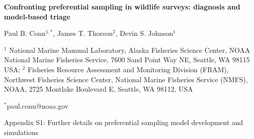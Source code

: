 \documentclass[times,mee,doublespace,]{besauth2}
\begin{document}
\begin{center} \bf {\large Confronting preferential sampling in wildlife surveys: diagnosis and model-based triage}

\vspace{0.7cm}
Paul B. Conn$^{1,*}$, James T. Thorson$^2$, Devin S. Johnson$^1$
\end{center}
\vspace{0.5cm}

\rm
\small


$^1$ National Marine Mammal Laboratory, Alaska Fisheries Science Center, NOAA National Marine Fisheries Service, 7600 Sand Point Way NE, Seattle, WA 98115 USA; $^2$ Fisheries Resource Assessment and Monitoring Division (FRAM), Northwest Fisheries Science Center, National Marine Fisheries Service (NMFS),
NOAA, 2725 Montlake Boulevard E, Seattle, WA 98112, USA

$^*$paul.conn@noaa.gov

\large
\bigskip
\centerline{Appendix S1: Further details on preferential sampling model development and simulations}
\bigskip
\small

\linenumbers

\def\VAR{{\rm Var}\,}
\def\COV{{\rm Cov}\,}
\def\Prob{{\rm P}\,}
\end{document}
